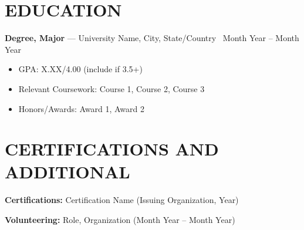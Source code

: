 \documentclass[10.5pt, letterpaper]{article}
\newcommand{\entry}[4]{%
  \noindent\textbf{#1} --- #3, #4 \textbar\ #2\par
  \vspace{2pt}
}
\newcommand{\resumeItem}[1]{\item #1}
\begin{document}
\section{EDUCATION}

\entry{Degree, Major}{Month Year -- Month Year}{University Name}{City, State/Country}
\begin{itemize}
  \resumeItem{GPA: X.XX/4.00 (include if 3.5+)}
  \resumeItem{Relevant Coursework: Course 1, Course 2, Course 3}
  \resumeItem{Honors/Awards: Award 1, Award 2}
\end{itemize}

\section{CERTIFICATIONS AND ADDITIONAL}
\noindent\textbf{Certifications:} Certification Name (Issuing Organization, Year)\par
\noindent\textbf{Volunteering:} Role, Organization (Month Year -- Month Year)
\end{document}
